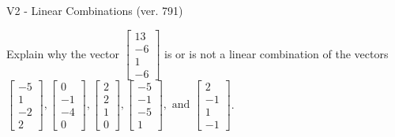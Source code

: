 \begin{exercise}
  \begin{exerciseTitle}V2 - Linear Combinations (ver. 791)\end{exerciseTitle}
  \begin{exerciseStatement}
    Explain why the vector \(\left[\begin{array}{c}
13 \\
-6 \\
1 \\
-6
\end{array}\right]\)  is or is not a linear 
	combination of the vectors \(\left[\begin{array}{c}
-5 \\
1 \\
-2 \\
2
\end{array}\right] , \left[\begin{array}{c}
0 \\
-1 \\
-4 \\
0
\end{array}\right] , \left[\begin{array}{c}
2 \\
2 \\
1 \\
0
\end{array}\right] , \left[\begin{array}{c}
-5 \\
-1 \\
-5 \\
1
\end{array}\right] , \text{ and } \left[\begin{array}{c}
2 \\
-1 \\
1 \\
-1
\end{array}\right]\).
	



\end{exerciseStatement}
\end{exercise}
